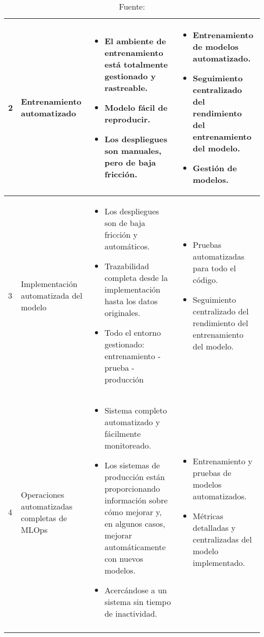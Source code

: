 \begin{longtable}{|p{2cm}|p{3cm}|p{5cm}|p{5cm}|}
    \hline
    2 & Entrenamiento automatizado & \begin{itemize}\item El ambiente de entrenamiento está totalmente gestionado y rastreable. \item Modelo fácil de reproducir. \item Los despliegues son manuales, pero de baja fricción.\end{itemize} & \begin{itemize}\item Entrenamiento de modelos automatizado. \item Seguimiento centralizado del rendimiento del entrenamiento del modelo. \item Gestión de modelos.\end{itemize} \\
    \hline
    3 & Implementación automatizada del modelo & \begin{itemize}\item Los despliegues son de baja fricción y automáticos. \item Trazabilidad completa desde la implementación hasta los datos originales. \item Todo el entorno gestionado: entrenamiento - prueba - producción\end{itemize} & \begin{itemize}\item Pruebas automatizadas para todo el código. \item Seguimiento centralizado del rendimiento del entrenamiento del modelo.\end{itemize} \\
    \hline
    4 & Operaciones automatizadas completas de MLOps & \begin{itemize}\item Sistema completo automatizado y fácilmente monitoreado. \item Los sistemas de producción están proporcionando información sobre cómo mejorar y, en algunos casos, mejorar automáticamente con nuevos modelos. \item Acercándose a un sistema sin tiempo de inactividad.\end{itemize} & \begin{itemize}\item Entrenamiento y pruebas de modelos automatizados. \item Métricas detalladas y centralizadas del modelo implementado.\end{itemize} \\
\hline
\caption*{\footnotesize Fuente: \cite{microsoft2023}}
\end{longtable}

